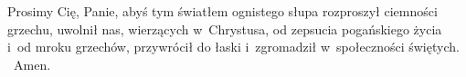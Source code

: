 \starthourpart[title={Zapalenie świecy Oazy\hfill{\tf por. Exsultet}}]
Prosimy Cię, Panie, abyś tym światłem ognistego słupa rozproszył ciemności
grzechu, uwolnił nas, wierzących w~Chrystusa, od zepsucia pogańskiego życia
i~od mroku grzechów, przywrócił do łaski i~zgromadził w~społeczności świętych.
~Amen.
\endinput
